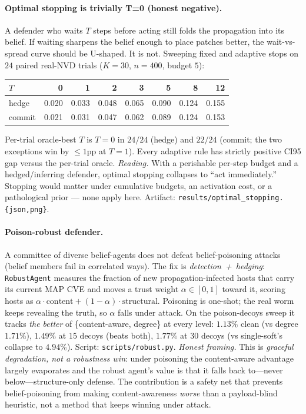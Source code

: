 \documentclass[11pt]{article}
\begin{document}
\paragraph{Optimal stopping is trivially T{=}0 (honest negative).}
A defender who waits $T$ steps before acting still folds the propagation into its
belief. If waiting sharpens the belief enough to place patches better, the
wait-vs-spread curve should be U-shaped. It is not. Sweeping fixed and adaptive
stops on $24$ paired real-NVD trials ($K{=}30$, $n{=}400$, budget $5$):
\begin{center}\small
\begin{tabular}{lrrrrrrr}
\toprule
$T$ & 0 & 1 & 2 & 3 & 5 & 8 & 12 \\
\midrule
hedge  & 0.020 & 0.033 & 0.048 & 0.065 & 0.090 & 0.124 & 0.155 \\
commit & 0.021 & 0.031 & 0.047 & 0.062 & 0.089 & 0.124 & 0.153 \\
\bottomrule
\end{tabular}
\end{center}
Per-trial oracle-best $T$ is $T{=}0$ in $24/24$ (hedge) and $22/24$ (commit; the
two exceptions win by $\leq 1$pp at $T{=}1$). Every adaptive rule has strictly
positive CI95 gap versus the per-trial oracle. \emph{Reading.} With a perishable
per-step budget and a hedged/inferring defender, optimal stopping collapses to
``act immediately.'' Stopping would matter under cumulative budgets, an
activation cost, or a pathological prior --- none apply here. Artifact:
\texttt{results/optimal\_stopping.\{json,png\}}.

\paragraph{Poison-robust defender.}
A committee of diverse belief-agents does not defeat belief-poisoning attacks
(belief members fail in correlated ways). The fix is \emph{detection~+~hedging}:
\texttt{RobustAgent} measures the fraction of new propagation-infected hosts
that carry its current MAP CVE and moves a trust weight $\alpha\!\in\![0,1]$
toward it, scoring hosts as
$\alpha\cdot\text{content} + (1-\alpha)\cdot\text{structural}$. Poisoning is
one-shot; the real worm keeps revealing the truth, so $\alpha$ falls under
attack. On the poison-decoys sweep it tracks \emph{the better} of
\{content-aware, degree\} at every level: $1.13\%$ clean (vs degree $1.71\%$),
$1.49\%$ at $15$ decoys (beats both), $1.77\%$ at $30$ decoys (vs single-soft's
collapse to $4.94\%$). Script: \texttt{scripts/robust.py}. \emph{Honest framing.}
This is \emph{graceful degradation, not a robustness win}: under poisoning the
content-aware advantage largely evaporates and the robust agent's value is that it
falls back to---never below---structure-only defense. The contribution is a safety
net that prevents belief-poisoning from making content-awareness \emph{worse} than
a payload-blind heuristic, not a method that keeps winning under attack.
\end{document}
